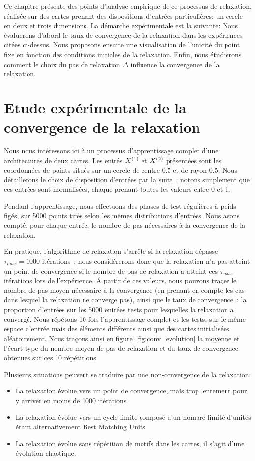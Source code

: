 \documentclass[../main]{subfiles}
\begin{document}
Ce chapitre présente des points d'analyse empirique de ce processus de relaxation, réalisée sur des cartes prenant des dispositions d'entrées particulières: un cercle en deux et trois dimensions.
La démarche expérimentale est la suivante:
Nous évaluerons d'abord le taux de convergence de la relaxation dans les expériences citées ci-dessus.
Nous proposons ensuite une visualisation de l'unicité du point fixe en fonction des conditions initiales de la relaxation. Enfin, nous étudierons comment le choix du pas de relaxation $\Delta$ influence la convergence de la relaxation.

\section{Etude expérimentale de la convergence de la relaxation}

Nous nous intéressons ici  à un processus d'apprentissage complet d'une architectures de deux cartes. Les entrés $X^{({1})}$ et $X^{({2})}$ présentées sont les coordonnées de points situés sur un cercle de centre 0.5 et de rayon 0.5. Nous détaillerons le choix de disposition d'entrées par la suite~; notons simplement que ces entrées sont normalisées, chaque prenant toutes les valeurs entre 0 et 1.

Pendant l'apprentissage, nous effectuons des phases de test régulières à poids figés, sur 5000 points tirés selon les mêmes distributions d'entrées. Nous avons compté, pour chaque entrée, le nombre de pas nécessaires à la convergence de la relaxation. 

En pratique, l'algorithme de relaxation s'arrête si la relaxation dépasse $\tau_{max}= 1000$ itérations~; nous considérerons donc que la relaxation n'a pas atteint un point de convergence si le nombre de pas de relaxation a atteint ces $\tau_{max}$ itérations lors de l'expérience. \'A partir de ces valeurs, nous pouvons traçer le nombre de pas moyen nécessaire à la convergence (en prenant en compte les cas dans lesquel la relaxation ne converge pas), ainsi que le taux de convergence~: la proportion d'entrées sur les 5000 entrées tests pour lesquelles la relaxation a convergé.
Nous répétons 10 fois l'apprentissage complet et les tests, sur le même espace d'entrée mais des éléments différents ainsi que des cartes initialisées aléatoirement.
Nous traçons ainsi en figure~\ref{fig:conv_evolution} la moyenne et l'écart type du nombre moyen de pas de relaxation et du taux de convergence obtenues sur ces 10 répétitions.

Plusieurs situations peuvent se traduire par une non-convergence de la relaxation:
\begin{itemize}
\item La relaxation évolue vers un point de convergence, mais trop lentement pour y arriver en moins de 1000 itérations
\item La relaxation évolue vers un cycle limite composé d'un nombre limité d'unités étant alternativement Best Matching Units
\item La relaxation évolue sans répétition de motifs dans les cartes, il s'agit d'une évolution chaotique.
\end{itemize}
\end{document}
